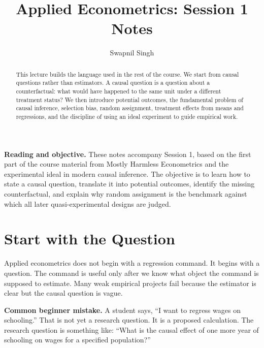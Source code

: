 

\title{Applied Econometrics: Session 1 Notes}
\author{Swapnil Singh}
\date{}


\setlength{\headheight}{26pt}


\maketitle

\begin{abstract}
This lecture builds the language used in the rest of the course. We start from
causal questions rather than estimators. A causal question is a question about a
counterfactual: what would have happened to the same unit under a different
treatment status? We then introduce potential outcomes, the fundamental problem
of causal inference, selection bias, random assignment, treatment effects from
means and regressions, and the discipline of using an ideal experiment to guide
empirical work.
\end{abstract}

\begin{boxD}
\textbf{Reading and objective.} These notes accompany Session 1, based on the
first part of the course material from Mostly Harmless Econometrics and the
experimental ideal in modern causal inference. The objective is to learn how to
state a causal question, translate it into potential outcomes, identify the
missing counterfactual, and explain why random assignment is the benchmark
against which all later quasi-experimental designs are judged.
\end{boxD}

\section{Start with the Question}

Applied econometrics does not begin with a regression command. It begins with a
question. The command is useful only after we know what object the command is
supposed to estimate. Many weak empirical projects fail because the estimator is
clear but the causal question is vague.

\begin{boxF}
\textbf{Common beginner mistake.} A student says, ``I want to regress wages on
schooling.'' That is not yet a research question. It is a proposed calculation.
The research question is something like: ``What is the causal effect of one more
year of schooling on wages for a specified population?''
\end{boxF}


